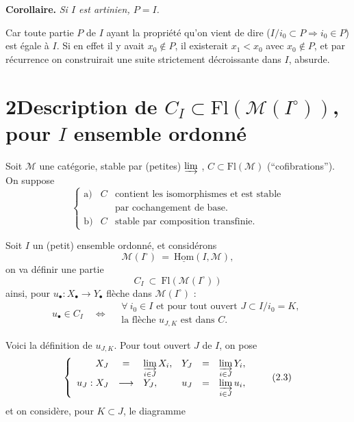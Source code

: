 \documentclass[11pt]{article}
\newcommand{\printedpage}[1]{\marginpar{\footnotesize p.~#1\ifstrequal{#1}{1}{\\[2pt]{[page 1]}}{}}}
\newcommand{\msp}[1]{\ifstrequal{#1}{page 1}{}{\marginpar{\footnotesize [#1]}}}
\newcommand{\Fl}{\mathrm{Fl}}
\newcommand{\M}{\mathcal{M}}
\begin{document}
\textbf{Corollaire.} \textit{Si $I$ est artinien, $P = I$.}

Car toute partie $P$ de $I$ ayant la propriété qu'on vient de dire ($I/i_0 \subset P \Longrightarrow i_0 \in P$) est égale à $I$. Si en effet il y avait $x_0 \notin P$, il existerait $x_1 < x_0$ avec $x_0 \notin P$, et par récurrence on construirait une suite strictement décroissante dans $I$, absurde. %

\msp{page 25}

\section*{2\quad Description de $C_I \subset \Fl(\M(I^\circ))$, pour $I$ ensemble ordonné}

Soit $\M$ une catégorie, stable par (petites) $\varinjlim$ , $C \subset \Fl(\M)$ (“cofibrations”). On suppose
\[
\left\{
\begin{array}{lll}
\text{a)} & C & \text{contient les isomorphismes et est stable}\\
 & & \text{par cochangement de base.}\\[1ex]
\text{b)} & C & \text{stable par composition transfinie.}
\end{array}
\right.
\tag*{(2.1)}
\]

Soit $I$ un (petit) ensemble ordonné, et considérons
\[
\M(I^\circ) \ =\ \underline{\mathrm{Hom}}(I,\M),
\]
on va définir une partie
\[
C_I \ \subset\ \Fl(\M(I^\circ))
\]
ainsi, pour $u_\bullet : X_\bullet \longrightarrow Y_\bullet$ flèche dans $\M(I^\circ)$ :
\[
u_\bullet \in C_I \quad\Longleftrightarrow\quad
\begin{array}{l}
\forall\ i_0 \in I \text{ et pour tout ouvert } J \subset I/i_0 = K,\\
\text{la flèche } u_{J,K} \text{ est dans } C.
\end{array}
\tag*{(2.2)}
\]

Voici la définition de $u_{J,K}$. Pour tout ouvert $J$ de $I$, on pose
\[
\left\{
\begin{array}{rclrcl}
X_J & = & \varinjlim\limits_{i\in J} X_i, & Y_J & = & \varinjlim\limits_{i\in J} Y_i,\\[2ex]
u_J : X_J & \longrightarrow & Y_J, & u_J & = & \varinjlim\limits_{i\in J} u_i,
\end{array}
\right.
\tag*{(2.3)}
\]
et on considère, pour $K \subset J$, le diagramme

\printedpage{15}
\end{document}
